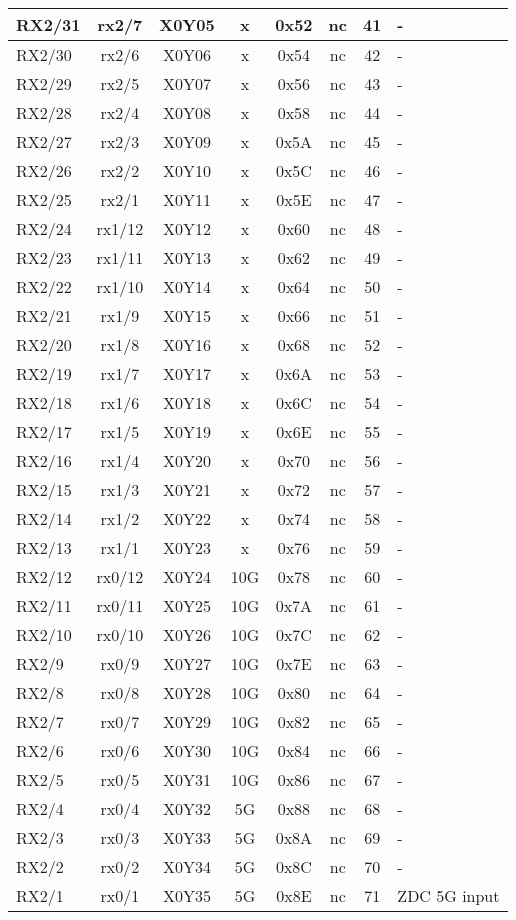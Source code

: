 \begin{longtable}{|l|c|c|c|c|c|c|l|}
RX2/31 & rx2/7  & X0Y05 &  x   & 0x52 & nc & 41 & -\\\hline
RX2/30 & rx2/6  & X0Y06 &  x   & 0x54 & nc & 42 & -\\\hline
RX2/29 & rx2/5  & X0Y07 &  x   & 0x56 & nc & 43 & -\\\hline
RX2/28 & rx2/4  & X0Y08 &  x   & 0x58 & nc & 44 & -\\\hline
RX2/27 & rx2/3  & X0Y09 &  x   & 0x5A & nc & 45 & -\\\hline
RX2/26 & rx2/2  & X0Y10 &  x   & 0x5C & nc & 46 & -\\\hline
RX2/25 & rx2/1  & X0Y11 &  x   & 0x5E & nc & 47 & -\\\hline
RX2/24 & rx1/12 & X0Y12 &  x   & 0x60 & nc & 48 & -\\\hline
RX2/23 & rx1/11 & X0Y13 &  x   & 0x62 & nc & 49 & -\\\hline
RX2/22 & rx1/10 & X0Y14 &  x   & 0x64 & nc & 50 & -\\\hline
RX2/21 & rx1/9  & X0Y15 &  x   & 0x66 & nc & 51 & -\\\hline
RX2/20 & rx1/8  & X0Y16 &  x   & 0x68 & nc & 52 & -\\\hline
RX2/19 & rx1/7  & X0Y17 &  x   & 0x6A & nc & 53 & -\\\hline
RX2/18 & rx1/6  & X0Y18 &  x   & 0x6C & nc & 54 & -\\\hline
RX2/17 & rx1/5  & X0Y19 &  x   & 0x6E & nc & 55 & -\\\hline
RX2/16 & rx1/4  & X0Y20 &  x   & 0x70 & nc & 56 & -\\\hline
RX2/15 & rx1/3  & X0Y21 &  x   & 0x72 & nc & 57 & -\\\hline
RX2/14 & rx1/2  & X0Y22 &  x   & 0x74 & nc & 58 & -\\\hline
RX2/13 & rx1/1  & X0Y23 &  x   & 0x76 & nc & 59 & -\\\hline
RX2/12 & rx0/12 & X0Y24 & 10G & 0x78 & nc & 60 & -\\\hline
RX2/11 & rx0/11 & X0Y25 & 10G & 0x7A & nc & 61 & -\\\hline
RX2/10 & rx0/10 & X0Y26 & 10G & 0x7C & nc & 62 & -\\\hline
RX2/9  & rx0/9  & X0Y27 & 10G & 0x7E & nc & 63 & -\\\hline
RX2/8  & rx0/8  & X0Y28 & 10G & 0x80 & nc & 64 & -\\\hline
RX2/7  & rx0/7  & X0Y29 & 10G & 0x82 & nc & 65 & -\\\hline
RX2/6  & rx0/6  & X0Y30 & 10G & 0x84 & nc & 66 & -\\\hline
RX2/5  & rx0/5  & X0Y31 & 10G & 0x86 & nc & 67 & -\\\hline
RX2/4  & rx0/4  & X0Y32 &  5G & 0x88 & nc & 68 & -\\\hline
RX2/3  & rx0/3  & X0Y33 &  5G & 0x8A & nc & 69 & -\\\hline
RX2/2  & rx0/2  & X0Y34 &  5G & 0x8C & nc & 70 & -\\\hline
RX2/1  & rx0/1  & X0Y35 &  5G & 0x8E & nc & 71 & ZDC 5G input\\\hline
\end{longtable}

